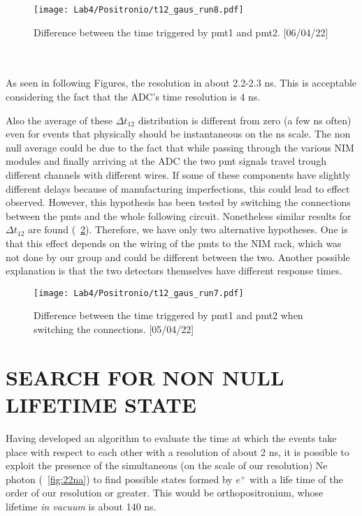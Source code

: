 \documentclass[10pt,a4paper,twocolumn]{article}
\begin{document}
\begin{figure}[h!]
\centering
\texttt{[image: Lab4/Positronio/t12\_gaus\_run8.pdf]} 
\caption{Difference between the time triggered by pmt1 and pmt2. [06/04/22]}
\label{fig:t12}
\end{figure}


\\
\\
As seen in following Figures, the resolution in about 2.2-2.3 ns. This is acceptable considering the fact that the ADC's time resolution is 4 ns.

Also the average of these $\Delta t_{12}$ distribution is different from zero (a few ns often) even for events that physically should be instantaneous on the ns scale. The non null average could be due to the fact that while passing through the various NIM modules and finally arriving at the ADC the two pmt signals travel trough different channels with different wires. If some of these components have slightly different delays because of manufacturing imperfections, this could lead to effect observed. However, this hypothesis has been tested by switching the connections between the pmts and the whole following circuit. Nonetheless similar results for $\Delta t_{12}$ are found (\figurename~\ref{fig:invertedt12}).
Therefore, we have only two alternative hypotheses. One is that this effect depends on the wiring of the pmts to the NIM rack, which was not done by our group and could be different between the two. Another possible explanation is that the two detectors themselves have different response times. 

\begin{figure}[h!]
\centering
\texttt{[image: Lab4/Positronio/t12\_gaus\_run7.pdf]} 
\caption{Difference between the time triggered by pmt1 and pmt2 when switching the connections. [05/04/22]}
\label{fig:invertedt12}
\end{figure}



\section{SEARCH FOR NON NULL LIFETIME STATE}

Having developed an algorithm to evaluate the time at which the events take place with respect to each other with a resolution of about 2 ns, it is possible to exploit the presence of the simultaneous (on the scale of our resolution) Ne photon (\figurename~\ref{fig:22na}) to find possible states formed by $e^+$ with a life time of the order of our resolution or greater. This would be orthopositronium, whose lifetime \textit{in vacuum} is about 140 ns. 
\end{document}
